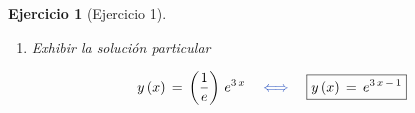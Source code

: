 \documentclass[a4paper,11pt, openany]{book}
\newtheorem{ejer}{Ejercicio}[section]
\newcommand*{\itembolasazules}[1]{%
\footnotesize\protect\tikz[baseline=-3pt]%
\protect\node[scale=.7, circle, shade, ball
color=green]{\color{white}\Large\bf#1};}
\begin{document}
\begin{ejer}[Ejercicio 1]
\begin{enumerate}[label=\itembolasazules{\arabic*}]
$$\left\{
\begin{array}{ll}
C_{1}\,e^{3}\,+\,C_{2}\,e^{2}\,=\,e^{2} \quad \textcolor{ceruleanblue}{\times}\,2 \\
3\,C_{1}\,e^{3}\,+\,2\,C_{2}\,e^{2}\,=\,3\,e^{2} \quad \textcolor{ceruleanblue}{\times}\,(-\,1)
\end{array}
\right.$$
 
$$\begin{array}{rr|r}
2\,C_{1}\,e^{3} & 2\,C_{2}\,e^{2} & 2\,e^{2}  \\ 
-\,3\,C_{1}\,e^{3} & -\,2\,C_{2}\,e^{2} & -\,3\,e^{2} \\
\cline{1-1} \cline{2-3}
-\,C_{1}\,e^{3} & \cancel & -\,e^{2}
\end{array} \quad \textcolor{ceruleanblue}{\iff} \quad -\,C_{1}\,e^{3}\,=\,-\,e^{2} \quad \textcolor{ceruleanblue}{\iff} \quad C_{1}\,=\,\dfrac{e^{2}}{e^{3}}$$
 
$$\boxed{C_{1}\,=\,\dfrac{1}{e}}$$
 
Sustituyendo $C_{1}\,=\,\dfrac{1}{e}$ 
 
$$\left(\textcolor{ceruleanblue}{\dfrac{1}{e}} \right)\,e^{3}\,+\,C_{2}\,e^{2}\,=\,e^{2} \quad \textcolor{ceruleanblue}{\iff} \quad e^{2}\,+\,C_{2}\,e^{2}\,=\,e^{2} \quad \textcolor{ceruleanblue}{\iff} \quad C_{2}\,e^{2}\,=\,e^{2}\,-\,e^{2}$$
 
$$C_{2}\,e^{2}\,=\,0 \quad \textcolor{ceruleanblue}{\iff} \quad \boxed{C_{2}\,=\,0}$$
 
\item Exhibir la solución particular
 
$$y\,(x)\,=\,\left(\dfrac{1}{e} \right)\,e^{3\,x} \quad \textcolor{ceruleanblue}{\iff} \quad \boxed{y\,(x)\,=\,e^{3\,x\,-\,1} }$$
 
\end{enumerate}
 
\end{ejer}
 
\end{document}
